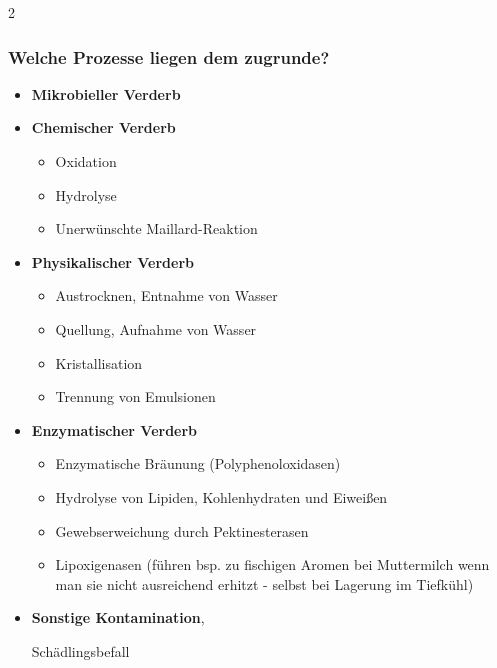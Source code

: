\documentclass[a4paper,11pt,twoside]{article}
\begin{document}
\begin{multicols}{2}
\begin{enumerate}[label=\textbf{\arabic*}]
{\subsubsection*{Welche Prozesse liegen dem zugrunde?}
\begin{itemize}
\item \textbf{Mikrobieller Verderb}
\item \textbf{Chemischer Verderb}
\begin{itemize}
\item Oxidation
\item Hydrolyse
\item Unerwünschte Maillard-Reaktion
\end{itemize}
\item \textbf{Physikalischer Verderb}
\begin{itemize}
\item Austrocknen, Entnahme von Wasser
\item Quellung, Aufnahme von Wasser
\item Kristallisation
\item Trennung von Emulsionen
\end{itemize}
\item \textbf{Enzymatischer Verderb}
\begin{itemize}
\item Enzymatische Bräunung (Polyphenoloxidasen)
\item Hydrolyse von Lipiden, Kohlenhydraten und Eiweißen
\item Gewebserweichung durch Pektinesterasen
\item Lipoxigenasen (führen bsp. zu fischigen Aromen bei Muttermilch wenn man sie nicht ausreichend erhitzt - selbst bei Lagerung im Tiefkühl)
\end{itemize}
\item \textbf{Sonstige Kontamination}, \par Schädlingsbefall
\end{itemize}
}

\pagebreak


\end{enumerate}
\end{multicols}
\end{document}
